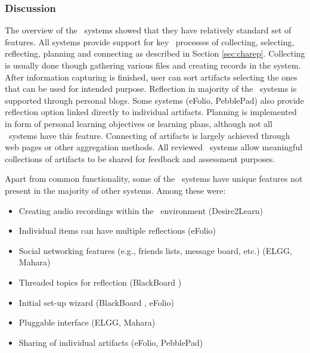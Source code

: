 \subsubsection{Discussion}
The overview of the \ep~systems showed that they have relatively standard set of
features. All systems provide support for key \ep~processes of collecting,
selecting, reflecting, planning and connecting as described in Section
\ref{sec:charep}. Collecting is usually done though gathering various files and
creating records in the system. After information capturing is finished, user
can sort artifacts selecting the ones that can be used for intended purpose.
Reflection in majority of the \ep~systems is supported through personal blogs.
Some systems (eFolio, PebblePad) also provide reflection option linked directly
to individual artifacts. Planning is implemented in form of personal learning
objectives or learning plans, although not all \ep~systems have this feature.
Connecting of artifacts is largely achieved through web pages or other
aggregation methods. All reviewed \ep~systems allow meaningful collections of
artifacts to be shared for feedback and assessment purposes.

Apart from common functionality, some of the \ep~systems have unique features
not present in the majority of other systems. Among these were:
\begin{itemize}
  \item Creating audio recordings within the \ep~environment (Desire2Learn)
  \item Individual items can have multiple reflections (eFolio)
  \item Social networking features (e.g., friends lists, message board, etc.)
  (ELGG, Mahara)
  \item Threaded topics for reflection (BlackBoard \ep)
  \item Initial set-up wizard (BlackBoard \ep, eFolio)
  \item Pluggable interface (ELGG, Mahara)
  \item Sharing of individual artifacts (eFolio, PebblePad)
\end{itemize}


